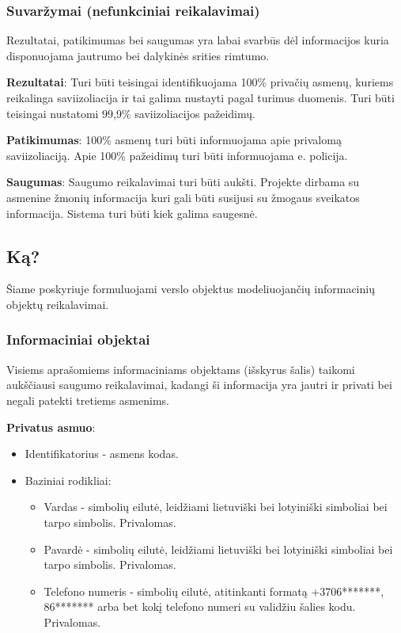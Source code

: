 \documentclass{VUMIFPSkursinis}
\begin{document}
\subsubsection{Suvaržymai (nefunkciniai reikalavimai)}
Rezultatai, patikimumas bei saugumas yra labai svarbūs dėl informacijos kuria disponuojama jautrumo bei dalykinės srities rimtumo.

\textbf{Rezultatai}:
Turi būti teisingai identifikuojama 100\% privačių asmenų, kuriems reikalinga saviizoliacija ir tai galima nustayti pagal turimus duomenis. 
Turi būti teisingai nustatomi 99,9\% saviizoliacijos pažeidimų.

\textbf{Patikimumas}:
100\% asmenų turi būti informuojama apie privalomą saviizoliaciją. Apie 100\% pažeidimų turi būti informuojama e. policija.

\textbf{Saugumas}:
Saugumo reikalavimai turi būti aukšti. Projekte dirbama su asmenine žmonių informacija kuri gali būti susijusi su žmogaus sveikatos informacija. Sistema turi būti kiek galima saugesnė.

\subsection{Ką?}
Šiame poskyriuje formuluojami verslo objektus modeliuojančių informacinių objektų reikalavimai.

\subsubsection{Informaciniai objektai}

Visiems aprašomiems informaciniams objektams (išskyrus šalis) taikomi aukščiausi saugumo reikalavimai, kadangi ši informacija yra jautri ir privati bei negali patekti tretiems asmenims.

\noindent\textbf{Privatus asmuo}:
\begin{itemize}
	\item Identifikatorius - asmens kodas.
	\item Baziniai rodikliai:
	\begin{itemize}
		\item Vardas - simbolių eilutė, leidžiami lietuviški bei lotyiniški simboliai bei tarpo simbolis. Privalomas.
		\item Pavardė - simbolių eilutė, leidžiami lietuviški bei lotyiniški simboliai bei tarpo simbolis. Privalomas.
		\item Telefono numeris - simbolių eilutė, atitinkanti formatą +3706*******, 86******* arba bet kokį telefono numeri su validžiu šalies kodu. Privalomas.
	\end{itemize}
\end{itemize}
\end{document}
